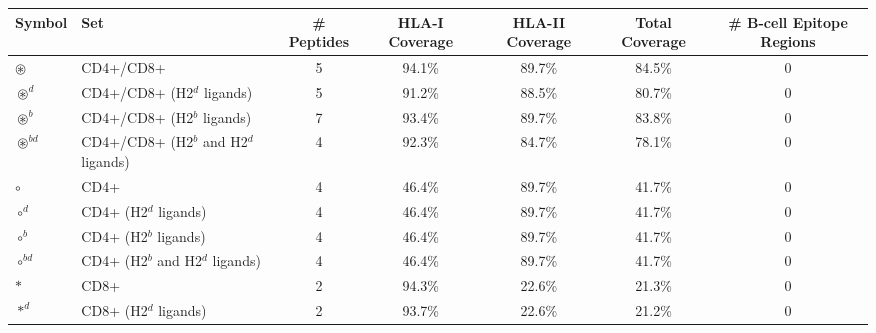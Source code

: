 \begin{tabular}{llccccc}
\toprule
                                              Symbol &                                      Set &  \# Peptides & HLA-I Coverage & HLA-II Coverage & Total Coverage &  \# B-cell Epitope Regions \\
\midrule
                                     $ \circledast $ &                                CD4+/CD8+ &            5 &         94.1\% &          89.7\% &         84.5\% &                          0 \\
                                   $ \circledast^d $ &               CD4+/CD8+ (H2$^d$ ligands) &            5 &         91.2\% &          88.5\% &         80.7\% &                          0 \\
                                   $ \circledast^b $ &               CD4+/CD8+ (H2$^b$ ligands) &            7 &         93.4\% &          89.7\% &         83.8\% &                          0 \\
                                $ \circledast^{bd} $ &    CD4+/CD8+ (H2$^b$ and H2$^d$ ligands) &            4 &         92.3\% &          84.7\% &         78.1\% &                          0 \\
                                           $ \circ $ &                                     CD4+ &            4 &         46.4\% &          89.7\% &         41.7\% &                          0 \\
                                         $ \circ^d $ &                    CD4+ (H2$^d$ ligands) &            4 &         46.4\% &          89.7\% &         41.7\% &                          0 \\
                                         $ \circ^b $ &                    CD4+ (H2$^b$ ligands) &            4 &         46.4\% &          89.7\% &         41.7\% &                          0 \\
                                      $ \circ^{bd} $ &         CD4+ (H2$^b$ and H2$^d$ ligands) &            4 &         46.4\% &          89.7\% &         41.7\% &                          0 \\
                                            $ \ast $ &                                     CD8+ &            2 &         94.3\% &          22.6\% &         21.3\% &                          0 \\
                                          $ \ast^d $ &                    CD8+ (H2$^d$ ligands) &            2 &         93.7\% &          22.6\% &         21.2\% &                          0 \\

\end{tabular}
